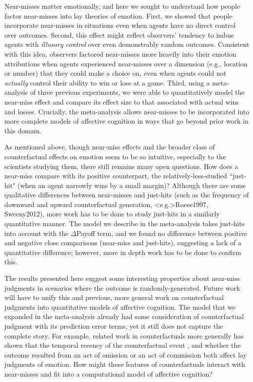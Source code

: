 \documentclass[10pt,letterpaper]{article}
\begin{document}
Near-misses matter emotionally, and here we sought to understand how people factor near-misses into lay theories of emotion. First, we showed that people incorporate near-misses in situations even when agents have no direct control over outcomes. Second, this effect might reflect observers' tendency to imbue agents with \textit{illusory control} over even demonstrably random outcomes.  Consistent with this idea, observers factored near-misses more heavily into their emotion attributions when agents experienced near-misses over a dimension (e.g., location or number) that they could make a choice on, even when agents could not \textit{actually} control their ability to win or lose at a game. Third, using a meta-analysis of three previous experiments, we were able to quantitatively model the near-miss effect and compare its effect size to that associated with actual wins and losses. Crucially, the meta-analysis allows near-misses to be incorporated into more complete models of affective cognition in ways that go beyond prior work in this domain.


	As mentioned above, though near-miss effects and the broader class of counterfactual effects on emotion seem to be so intuitive, especially to the scientists studying them, there still remains many open questions. How does a near-miss compare with its positive counterpart, the relatively-less-studied ``just-hit" (when an agent narrowly wins by a small margin)? Although there are some qualitative differences between near-misses and just-hits (such as the frequency of downward and upward counterfactual generation, \citeNP<e.g.>{Roese1997, Sweeny2012}), more work has to be done to study just-hits in a similarly quantitative manner. The model we describe in the meta-analysis takes just-hits into account with the $\Delta$Payoff term, and we found no difference between positive and negative close comparisons (near-miss and just-hits), suggesting a lack of a quantitative difference; however, more in depth work has to be done to confirm this.

	The results presented here suggest some interesting properties about near-miss judgments in scenarios where the outcome is randomly-generated. Future work will have to unify this and previous, more general work on counterfactual judgments into quantitative models of affective cognition. The model that we expanded in the meta-analysis already had some consideration of counterfactual judgment with its prediction error terms, yet it still does not capture the complete story. For example, related work in counterfactuals more generally has shown that the temporal recency of the counterfactual event \cite{Miller1990}, and whether the outcome resulted from an act of omission or an act of commission \cite{Kahneman1982, Landman1987} both affect lay judgments of emotion. How might these features of counterfactuals interact with near-misses and fit into a computational model of affective cognition? 
\end{document}
